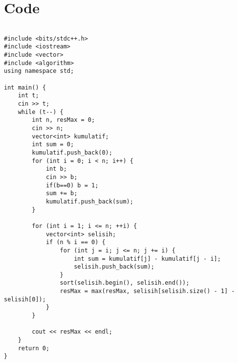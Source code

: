 \documentclass{article}
\begin{document}
\newpage
\section{Code}

\begin{lstlisting}

#include <bits/stdc++.h>
#include <iostream>
#include <vector>
#include <algorithm>
using namespace std;

int main() {
    int t;
    cin >> t;
    while (t--) {
        int n, resMax = 0;
        cin >> n;
        vector<int> kumulatif;
        int sum = 0;
        kumulatif.push_back(0);
        for (int i = 0; i < n; i++) {
            int b;
            cin >> b;
            if(b==0) b = 1;
            sum += b;
            kumulatif.push_back(sum);
        }

        for (int i = 1; i <= n; ++i) {
            vector<int> selisih;
            if (n % i == 0) {
                for (int j = i; j <= n; j += i) {
                    int sum = kumulatif[j] - kumulatif[j - i];
                    selisih.push_back(sum);
                }
                sort(selisih.begin(), selisih.end());
                resMax = max(resMax, selisih[selisih.size() - 1] - selisih[0]);
            }
        }

        cout << resMax << endl;
    }
    return 0;
}

\end{lstlisting}
\end{document}
